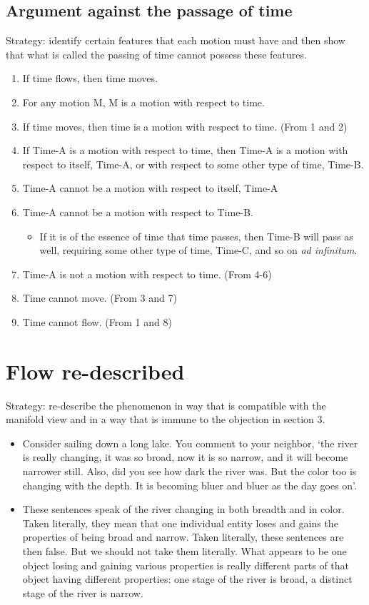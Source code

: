 \documentclass[]{article}
\begin{document}
\subsection{Argument against the passage of time}

\noindent Strategy: identify certain features that each motion must have and then show that what is called the passing of time cannot possess these features. 

\begin{enumerate} 
\item If time flows, then time moves. 
\item For any motion M, M is a motion with respect to time.
\item If time moves, then time is a motion with respect to time. (From 1 and 2) 
\item If Time-A is a motion with respect to time, then Time-A is a motion with respect to itself, Time-A, or with respect to some other type of time, Time-B.  
\item Time-A cannot be a motion with respect to itself, Time-A
\item Time-A cannot be a motion with respect to Time-B. 
\begin{itemize}
\item If it is of the essence of time that time passes, then Time-B will pass as well, requiring some other type of time, Time-C, and so on \emph{ad infinitum}. 
\end{itemize}
\item Time-A is not a motion with respect to time. (From 4-6)
\item Time cannot move. (From 3 and 7) 
\item Time cannot flow. (From 1 and 8)
\end{enumerate}
\section{Flow re-described}

\noindent Strategy: re-describe the phenomenon in way that is compatible with the manifold view and in a way that is immune to the objection in section 3. 

\begin{itemize}
\item Consider sailing down a long lake. You comment to your neighbor, `the river is really changing, it was so broad, now it is so narrow, and it will become narrower still. Also, did you see how dark the river was. But the color too is changing with the depth. It is becoming bluer and bluer as the day goes on'. 
\item These sentences speak of the river changing in both breadth and in color. Taken literally, they mean that one individual entity loses and gains the properties of being broad and narrow. Taken literally, these sentences are then false. But we should not take them literally. What appears to be one object losing and gaining various properties is really different parts of that object having different properties: one stage of the river is broad, a distinct stage of the river is narrow. 
\end{itemize}
\end{document}
